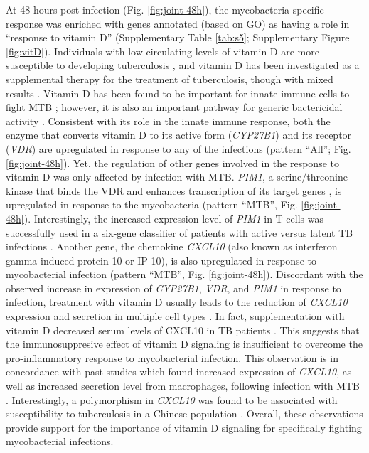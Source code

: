 At 48 hours post-infection (Fig. \ref{fig:joint-48h}), the mycobacteria-specific
response was enriched with genes annotated (based on GO) as having a
role in ``response to vitamin D'' (Supplementary Table \ref{tab:s5}; Supplementary
Figure \ref{fig:vitD}). Individuals with low circulating levels of vitamin D are
more susceptible to developing tuberculosis \citep{Zodpey2007,
Nnoaham2008}, and vitamin D has been investigated as a supplemental
therapy for the treatment of tuberculosis, though with mixed results
\citep{Martineau2007, Lucas2014, Xia2014, Kearns2015}. Vitamin D has
been found to be important for innate immune cells to fight MTB
\citep{Liu2006, Verway2013, Xu2014}; however, it is also an important
pathway for generic bactericidal activity \citep{Hewison2011}. Consistent
with its role in the innate immune response, both the enzyme that
converts vitamin D to its active form (\emph{CYP27B1}) and its receptor
(\emph{VDR}) are upregulated in response to any of the infections
(pattern ``All''; Fig. \ref{fig:joint-48h}). Yet, the regulation of other genes involved
in the response to vitamin D was only affected by infection with MTB.
\emph{PIM1}, a serine/threonine kinase that binds the VDR and enhances
transcription of its target genes \citep{Maier2012}, is upregulated in
response to the mycobacteria (pattern ``MTB'', Fig. \ref{fig:joint-48h}). Interestingly,
the increased expression level of \emph{PIM1} in T-cells was
successfully used in a six-gene classifier of patients with active
versus latent TB infections \citep{Jacobsen2011}. Another gene, the
chemokine \emph{CXCL10} (also known as interferon gamma-induced protein
10 or IP-10), is also upregulated in response to mycobacterial infection
(pattern ``MTB'', Fig. \ref{fig:joint-48h}). Discordant with the observed increase in
expression of \emph{CYP27B1}, \emph{VDR}, and \emph{PIM1} in response to
infection, treatment with vitamin D usually leads to the reduction of
\emph{CXCL10} expression and secretion in multiple cell types
\citep{Gysemans2005, Adorini2005, Scolletta2013}. In fact,
supplementation with vitamin D decreased serum levels of CXCL10 in TB
patients \citep{Coussens2012}. This suggests that the immunosuppresive
effect of vitamin D signaling is insufficient to overcome the
pro-inflammatory response to mycobacterial infection. This observation
is in concordance with past studies which found increased expression of
\emph{CXCL10}, as well as increased secretion level from macrophages,
following infection with MTB \citep{Zhu2006, Verway2013}. Interestingly,
a polymorphism in \emph{CXCL10} was found to be associated with
susceptibility to tuberculosis in a Chinese population \citep{Tang2009,
Azad2012}. Overall, these observations provide support for the
importance of vitamin D signaling for specifically fighting
mycobacterial infections.

